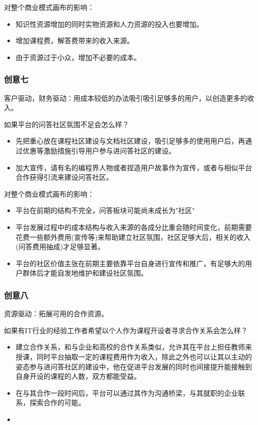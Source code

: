 \documentclass[a4paper]{ctexart}
\begin{document}
对整个商业模式画布的影响：
\begin{itemize}
  \item 知识性资源增加的同时实物资源和人力资源的投入也要增加。
  \item 增加课程费，解答费带来的收入来源。
  \item 由于资源过于小众，增加不必要的成本。
\end{itemize}

\subsubsection{创意七}
客户驱动，财务驱动：用成本较低的办法吸引吸引足够多的用户，以创造更多的收入。

如果平台的问答社区氛围不足会怎么样？
\begin{itemize}
  \item 先把重心放在课程社区建设与文档社区建设，吸引足够多的使用用户后，再通过优惠等激励措施引导用户参与进问答社区的建设。
  \item 加大宣传，请有名的编程界人物或者捏造用户故事作为宣传，或者与相似平台合作获得引流来建设问答社区。
\end{itemize}

对整个商业模式画布的影响：
\begin{itemize}
  \item 平台在前期的结构不完全，问答板块可能尚未成长为"社区"
  \item 平台发展过程中的成本结构与收入来源的各成分比重会随时间变化，前期需要花费一些额外费用(宣传等)来帮助建立社区氛围，社区足够大后，相关的收入(问答费用抽成)才足够显著。
  \item 平台的社区价值主张在前期主要依靠平台自身进行宣传和推广，有足够大的用户群体后才能自发地维护和建设社区氛围。
\end{itemize}

\subsubsection{创意八}
资源驱动：拓展可用的合作资源。

如果有IT行业的经验工作者希望以个人作为课程开设者寻求合作关系会怎么样？
\begin{itemize}
  \item 建立合作关系，和与企业和高校的合作关系类似，允许其在平台上担任教师来授课，同时平台抽取一定的课程费用作为收入，除此之外也可以让其以主动的姿态参与进问答社区的建设中，他在促进平台发展的同时也间接提升能接触到自身开设的课程的人数，双方都能受益。
  \item 在与其合作一段时间后，平台可以通过其作为沟通桥梁，与其就职的企业联系，探索合作的可能。
  \item 
\end{itemize}
\end{document}
